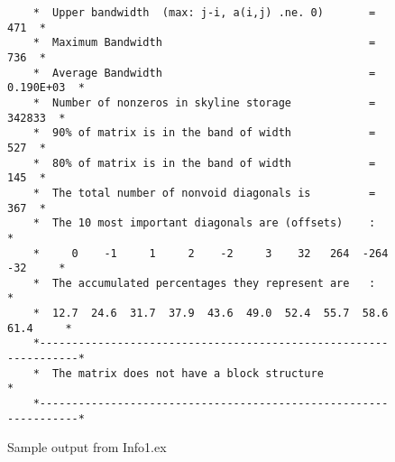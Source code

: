 \begin{figure}
\begin{verbatim}
    *  Upper bandwidth  (max: j-i, a(i,j) .ne. 0)       =        471  *
    *  Maximum Bandwidth                                =        736  *
    *  Average Bandwidth                                =  0.190E+03  *
    *  Number of nonzeros in skyline storage            =     342833  *
    *  90% of matrix is in the band of width            =        527  *
    *  80% of matrix is in the band of width            =        145  *
    *  The total number of nonvoid diagonals is         =        367  *
    *  The 10 most important diagonals are (offsets)    :             *
    *     0    -1     1     2    -2     3    32   264  -264   -32     *
    *  The accumulated percentages they represent are   :             *
    *  12.7  24.6  31.7  37.9  43.6  49.0  52.4  55.7  58.6  61.4     *
    *-----------------------------------------------------------------*
    *  The matrix does not have a block structure                     *
    *-----------------------------------------------------------------*
\end{verbatim}
\caption{Sample output from Info1.ex \label{Fig1} } 
\end{figure}


